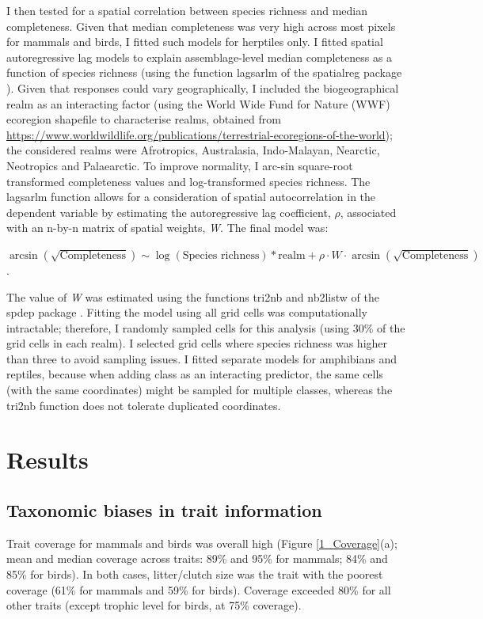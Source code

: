 I then tested for a spatial correlation between species richness and median completeness. Given that median completeness was very high across most pixels for mammals and birds, I fitted such models for herptiles only. I fitted spatial autoregressive lag models to explain assemblage-level median completeness as a function of species richness (using the function lagsarlm of the spatialreg package \citep{spatialreg1, spatialreg2, spatialreg3}). Given that responses could vary geographically, I included the biogeographical realm as an interacting factor (using the World Wide Fund for Nature (WWF) ecoregion shapefile to characterise realms, obtained from \url{https://www.worldwildlife.org/publications/terrestrial-ecoregions-of-the-world}); the considered realms were Afrotropics, Australasia, Indo-Malayan, Nearctic, Neotropics and Palaearctic. To improve normality, I arc-sin square-root transformed completeness values and log-transformed species richness. The lagsarlm function allows for a consideration of spatial autocorrelation in the dependent variable by estimating the autoregressive lag coefficient, $\rho$, associated with an n-by-n matrix of spatial weights, \textit{W}. The final model was:
\begin{center}
$\arcsin(\sqrt{\text{Completeness}})\sim \log(\text{Species richness}) \ast \text{realm} + \rho \cdot W \cdot \arcsin(\sqrt{\text{Completeness}})$.\\
\end{center}

The value of \textit{W} was estimated using the functions tri2nb and nb2listw of the spdep package \citep{spatialreg3, spdep1}. Fitting the model using all grid cells was computationally intractable; therefore, I randomly sampled cells for this analysis (using 30\% of the grid cells in each realm). I selected grid cells where species richness was higher than three to avoid sampling issues. I fitted separate models for amphibians and reptiles, because when adding class as an interacting predictor, the same cells (with the same coordinates) might be sampled for multiple classes, whereas the tri2nb function does not tolerate duplicated coordinates.

\section{Results}

\subsection{Taxonomic biases in trait information}
Trait coverage for mammals and birds was overall high (Figure \ref{1_Coverage}(a); mean and median coverage across traits: 89\% and 95\% for mammals; 84\% and 85\% for birds). In both cases, litter/clutch size was the trait with the poorest coverage (61\% for mammals and 59\% for birds). Coverage exceeded 80\% for all other traits (except  trophic level for birds, at 75\% coverage).

